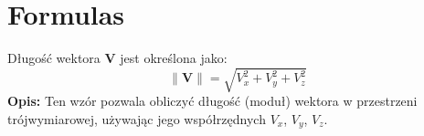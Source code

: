 \section{Formulas}


Długość wektora \( \mathbf{V} \) jest określona jako:
\[
\|\mathbf{V}\| = \sqrt{V_x^2 + V_y^2 + V_z^2}
\]
\textbf{Opis:} Ten wzór pozwala obliczyć długość (moduł) wektora w przestrzeni trójwymiarowej, używając jego współrzędnych \( V_x \), \( V_y \), \( V_z \).
